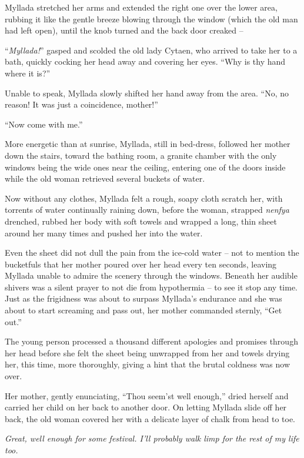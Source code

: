 Myllada stretched her arms and extended the right one over the lower area, rubbing it like the gentle breeze blowing through the window (which the old man had left open), until the knob turned and the back door creaked --

``\emph{Myllada!}'' gasped and scolded the old lady Cytaen, who arrived to take her to a bath, quickly cocking her head away and covering her eyes. ``Why is thy hand where it is?''

Unable to speak, Myllada slowly shifted her hand away from the area. ``No, no reason! It was just a coincidence, mother!''

``Now come with me.''

More energetic than at sunrise, Myllada, still in bed-dress, followed her mother down the stairs, toward the bathing room, a granite chamber with the only windows being the wide ones near the ceiling, entering one of the doors inside while the old woman retrieved several buckets of water.

Now without any clothes, Myllada felt a rough, soapy cloth scratch her, with torrents of water continually raining down, before the woman, strapped \emph{nenfya} drenched, rubbed her body with soft towels and wrapped a long, thin sheet around her many times and pushed her into the water.

Even the sheet did not dull the pain from the ice-cold water -- not to mention the bucketfuls that her mother poured over her head every ten seconds, leaving Myllada unable to admire the scenery through the windows. Beneath her audible shivers was a silent prayer to not die from hypothermia -- to see it stop any time. Just as the frigidness was about to surpass Myllada's endurance and she was about to start screaming and pass out, her mother commanded sternly, ``Get out.''

The young person processed a thousand different apologies and promises through her head before she felt the sheet being unwrapped from her and towels drying her, this time, more thoroughly, giving a hint that the brutal coldness was now over.

Her mother, gently enunciating, ``Thou seem'st well enough,'' dried herself and carried her child on her back to another door. On letting Myllada slide off her back, the old woman covered her with a delicate layer of chalk from head to toe.

\emph{Great, well enough for some festival. I'll probably walk limp for the rest of my life too.}

\centeredstars

